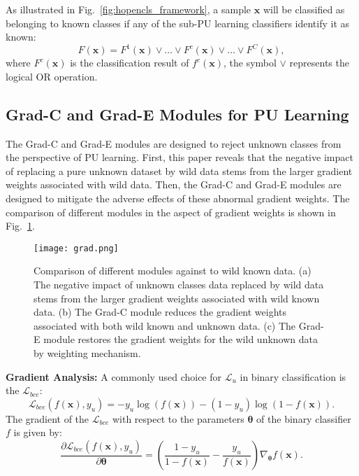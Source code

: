 As illustrated in Fig.~\ref{fig:hopencls_framework}, a sample $\boldsymbol{x}$ will be classified as belonging to known classes if any of the sub-PU learning classifiers identify it as known:
\begin{equation}
    F(\boldsymbol{x})=F^{1}(\boldsymbol{x}) \vee \dots \vee F^{c}(\boldsymbol{x}) \vee \dots \vee F^{C}(\boldsymbol{x}),
    \label{eq:unknown_rejection_multi_pu_head}
\end{equation}
where $F^{c}(\boldsymbol{x})$ is the classification result of $f^{c}(\boldsymbol{x})$, the symbol $\vee$ represents the logical OR operation.

\subsection{Grad-C and Grad-E Modules for PU Learning}

The Grad-C and Grad-E modules are designed to reject unknown classes from the perspective of PU learning. First, this paper reveals that the negative impact of replacing a pure unknown dataset by wild data stems from the larger gradient weights associated with wild data. Then, the Grad-C and Grad-E modules are designed to mitigate the adverse effects of these abnormal gradient weights. The comparison of different modules in the aspect of gradient weights is shown in Fig.~\ref{fig:grad}.

\begin{figure}[!t]
    \centering
    \texttt{[image: grad.png]}
    \caption{Comparison of different modules against to wild known data. (a) The negative impact of unknown classes data replaced by wild data stems from the larger gradient weights associated with wild known data. (b) The Grad-C module reduces the gradient weights associated with both wild known and unknown data. (c) The Grad-E module restores the gradient weights for the wild unknown data by weighting mechanism.}
    \label{fig:grad}
\end{figure}

\noindent \textbf{Gradient Analysis:}
A commonly used choice for $\mathcal{L}_{u}$ in binary classification is the $\mathcal{L}_{bce}$:
\begin{equation}\nonumber
    \mathcal{L}_{bce}(f(\boldsymbol{x}),y_{u})=-y_{u}\log(f(\boldsymbol{x}))-(1-y_{u})\log(1-f(\boldsymbol{x})).
    \label{eq:binary_cross_entropy}
\end{equation}
The gradient of the $\mathcal{L}_{bce}$ with respect to the parameters $\boldsymbol{\theta}$ of the binary classifier $f$ is given by:
\begin{equation}
    \frac{\partial \mathcal{L}_{bce}(f(\boldsymbol{x}),y_{u})}{\partial \boldsymbol{\theta}}=(\frac{1-y_{u}}{1-f(\boldsymbol{x})}-\frac{y_{u}}{f(\boldsymbol{x})})\nabla_{\boldsymbol{\theta}}f({\boldsymbol{x}}).
    \label{eq:gradient_binary_cross_entropy}
\end{equation}

